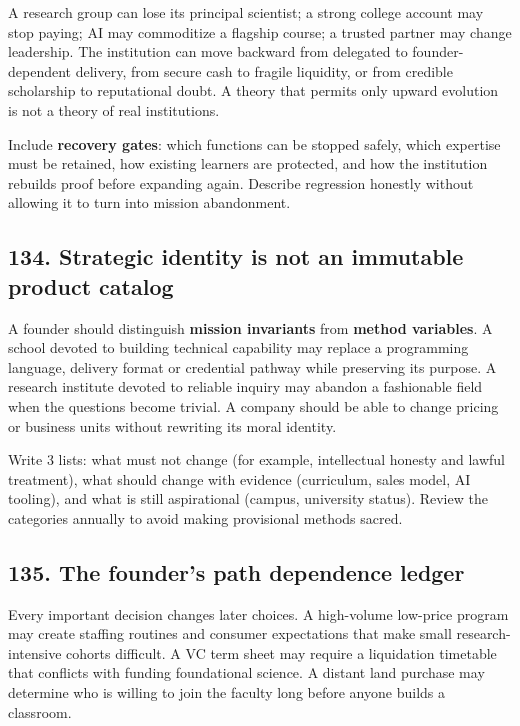 A research group can lose its principal scientist; a strong college account may stop paying; AI may commoditize a flagship course; a trusted partner may change leadership. The institution can move backward from delegated to founder-dependent delivery, from secure cash to fragile liquidity, or from credible scholarship to reputational doubt. A theory that permits only upward evolution is not a theory of real institutions.

Include \textbf{recovery gates}: which functions can be stopped safely, which expertise must be retained, how existing learners are protected, and how the institution rebuilds proof before expanding again. Describe regression honestly without allowing it to turn into mission abandonment.

\subsection{134. Strategic identity is not an immutable product catalog}

A founder should distinguish \textbf{mission invariants} from \textbf{method variables}. A school devoted to building technical capability may replace a programming language, delivery format or credential pathway while preserving its purpose. A research institute devoted to reliable inquiry may abandon a fashionable field when the questions become trivial. A company should be able to change pricing or business units without rewriting its moral identity.

Write 3 lists: what must not change (for example, intellectual honesty and lawful treatment), what should change with evidence (curriculum, sales model, AI tooling), and what is still aspirational (campus, university status). Review the categories annually to avoid making provisional methods sacred.

\subsection{135. The founder's path dependence ledger}

Every important decision changes later choices. A high-volume low-price program may create staffing routines and consumer expectations that make small research-intensive cohorts difficult. A VC term sheet may require a liquidation timetable that conflicts with funding foundational science. A distant land purchase may determine who is willing to join the faculty long before anyone builds a classroom.

